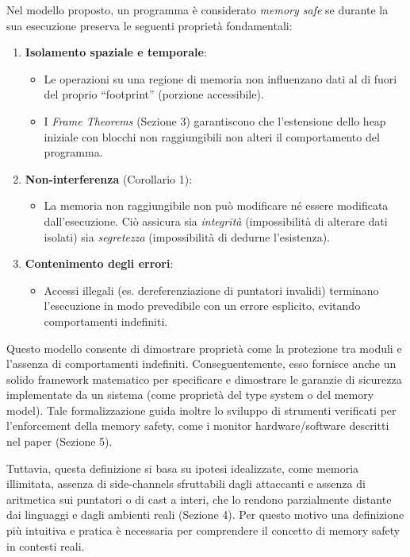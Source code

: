 Nel modello proposto, un programma è considerato \textit{memory safe} se durante
la sua esecuzione preserva le seguenti proprietà fondamentali:
\begin{enumerate}
  \item \textbf{Isolamento spaziale e temporale}:
    \begin{itemize}
      \item Le operazioni su una regione di memoria non influenzano dati al di fuori
        del proprio ``footprint'' (porzione accessibile).

      \item I \textit{Frame Theorems} (Sezione 3) garantiscono che l'estensione
        dello heap iniziale con blocchi non raggiungibili non alteri il
        comportamento del programma.
    \end{itemize}

  \item \textbf{Non-interferenza} (Corollario 1):
    \begin{itemize}
      \item La memoria non raggiungibile non può modificare né essere modificata
        dall'esecuzione. Ciò assicura sia \textit{integrità} (impossibilità di
        alterare dati isolati) sia \textit{segretezza} (impossibilità di dedurne
        l'esistenza).
    \end{itemize}

  \item \textbf{Contenimento degli errori}:
    \begin{itemize}
      \item Accessi illegali (es. dereferenziazione di puntatori invalidi)
        terminano l'esecuzione in modo prevedibile con un errore esplicito, evitando
        comportamenti indefiniti.
    \end{itemize}
\end{enumerate}

Questo modello consente di dimostrare proprietà come la protezione tra moduli e
l'assenza di comportamenti indefiniti. Conseguentemente, esso fornisce anche un
solido framework matematico per specificare e dimostrare le garanzie di
sicurezza implementate da un sistema (come proprietà del type system o del memory
model). Tale formalizzazione guida inoltre lo sviluppo di strumenti verificati per
l'enforcement della memory safety, come i monitor hardware/software descritti
nel paper (Sezione 5).

Tuttavia, questa definizione si basa su ipotesi idealizzate, come memoria
illimitata, assenza di side-channels sfruttabili dagli attaccanti e assenza di aritmetica
sui puntatori o di cast a interi, che lo rendono parzialmente distante dai
linguaggi e dagli ambienti reali (Sezione 4). Per questo motivo una definizione più
intuitiva e pratica è necessaria per comprendere il concetto di memory safety in
contesti reali.

